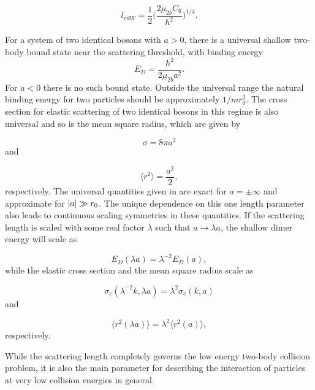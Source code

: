 \begin{equation}
l_{vdW} = \frac{1}{2}\bigg(\frac{2\mu_{2b} C_6}{\hbar^2}\bigg)^{1/4}.
\end{equation}

For a system of two identical bosons with $a>0$, there is a universal shallow two-body bound state near the scattering threshold, with binding energy 
\begin{equation}\label{shallowdimer}
E_D = \frac{\hbar^2}{2 \mu_{2b} a^2}.
\end{equation}
For $a<0$ there is no such bound state. Outside the universal range the natural binding energy for two particles should be approximately $1/mr_0^2$. The cross section for elastic scattering of two identical bosons in this regime is also universal and so is the mean square radius, which are given by

\begin{equation}\label{elasticcross}
\sigma = 8\pi a^2
\end{equation}
and

\begin{equation}\label{meanradius}
\langle r^2\rangle = \frac{a^2}{2},
\end{equation}
respectively. The universal quantities given in  are exact for $a=\pm \infty$ and approximate for $\lvert a\rvert\gg r_0$. The unique dependence on this one length parameter also leads to continuous scaling symmetries in these quantities. If the scattering length is scaled with some real factor $\lambda$ such that $a \to \lambda a$, the shallow dimer energy will scale as 

\begin{equation}
E_D(\lambda a) = \lambda^{-2}E_D(a),
\end{equation}    
while the elastic cross section and the mean square radius scale as 

\begin{equation}
\sigma_e(\lambda^{-2}k,\lambda a) = \lambda^2 \sigma_e(k,a)
\end{equation}
and

\begin{equation}
\langle r^2(\lambda a)\rangle = \lambda^2 \langle r^2(a)\rangle ,
\end{equation}
respectively. 

While the scattering length completely governs the low energy two-body collision problem, it is also the main parameter for describing the interaction of particles at very low collision energies in general. 


